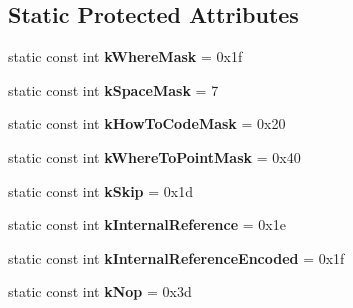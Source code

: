 \subsection*{Static Protected Attributes}
\begin{DoxyCompactItemize}
\item 
static const int {\bfseries k\+Where\+Mask} = 0x1f\hypertarget{classv8_1_1internal_1_1_serializer_deserializer_a146c73aee13a3a5f96ad2cbae1751c71}{}\label{classv8_1_1internal_1_1_serializer_deserializer_a146c73aee13a3a5f96ad2cbae1751c71}

\item 
static const int {\bfseries k\+Space\+Mask} = 7\hypertarget{classv8_1_1internal_1_1_serializer_deserializer_a1bf1b8de7b9b3f35cc0ca1828853f516}{}\label{classv8_1_1internal_1_1_serializer_deserializer_a1bf1b8de7b9b3f35cc0ca1828853f516}

\item 
static const int {\bfseries k\+How\+To\+Code\+Mask} = 0x20\hypertarget{classv8_1_1internal_1_1_serializer_deserializer_ab851c89661ac2089878b119a7ceabd30}{}\label{classv8_1_1internal_1_1_serializer_deserializer_ab851c89661ac2089878b119a7ceabd30}

\item 
static const int {\bfseries k\+Where\+To\+Point\+Mask} = 0x40\hypertarget{classv8_1_1internal_1_1_serializer_deserializer_ab62dcee183deaa224de1dc5ec5c31889}{}\label{classv8_1_1internal_1_1_serializer_deserializer_ab62dcee183deaa224de1dc5ec5c31889}

\item 
static const int {\bfseries k\+Skip} = 0x1d\hypertarget{classv8_1_1internal_1_1_serializer_deserializer_a129fe9a08d43acb1f781ce637b015b13}{}\label{classv8_1_1internal_1_1_serializer_deserializer_a129fe9a08d43acb1f781ce637b015b13}

\item 
static const int {\bfseries k\+Internal\+Reference} = 0x1e\hypertarget{classv8_1_1internal_1_1_serializer_deserializer_a0b33bef302fc9d7112b80f12f83368d6}{}\label{classv8_1_1internal_1_1_serializer_deserializer_a0b33bef302fc9d7112b80f12f83368d6}

\item 
static const int {\bfseries k\+Internal\+Reference\+Encoded} = 0x1f\hypertarget{classv8_1_1internal_1_1_serializer_deserializer_a5cd573c1059de94b2439642a8e9728d2}{}\label{classv8_1_1internal_1_1_serializer_deserializer_a5cd573c1059de94b2439642a8e9728d2}

\item 
static const int {\bfseries k\+Nop} = 0x3d\hypertarget{classv8_1_1internal_1_1_serializer_deserializer_a9d864747570a2c08fbc0103cf231dd52}{}\label{classv8_1_1internal_1_1_serializer_deserializer_a9d864747570a2c08fbc0103cf231dd52}


\end{DoxyCompactItemize}
